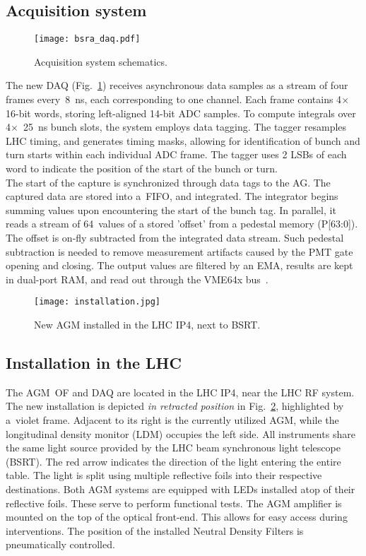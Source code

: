 \subsection{Acquisition system}
\begin{figure}[!tbh]
    \centering
    \texttt{[image: bsra\_daq.pdf]}
    \caption{Acquisition system schematics.}
    \label{fig:bsra_daq}
\end{figure}
%
The new DAQ (Fig.~\ref{fig:bsra_daq}) receives asynchronous data samples as a stream of four frames every~\SI{8}{\nano s}, each corresponding to one channel.
%
Each frame contains 4$\times$16-bit words, storing left-aligned 14-bit ADC samples. 
%
To compute integrals over 4$\times$~\SI{25}{\nano\second} bunch slots, the system employs data tagging. 
%
The tagger resamples LHC timing, and generates timing masks, allowing for identification of bunch and turn starts within each individual ADC frame.
%
The tagger uses 2 LSBs of each word to indicate the position of the start of the bunch or turn.
\\
The start of the capture is synchronized through data tags to the AG.
%
The captured data are stored into a~FIFO, and integrated. 
%
The integrator begins summing values upon encountering the start of the bunch tag.
%
In parallel, it reads a stream of 64~values of a stored 'offset' from a pedestal memory (P[63:0]).
%
The offset is on-fly subtracted from the integrated data stream. 
%
Such pedestal subtraction is needed to remove measurement artifacts caused by the PMT gate opening and closing. 
%
The output values are filtered by an EMA, results are kept in dual-port RAM, and read out through the VME64x bus~\cite{my_thesis}.

\begin{figure}[!tbh]
    \centering
    \texttt{[image: installation.jpg]}
    \caption{New AGM installed in the LHC IP4, next to BSRT.}
    \label{fig:installation}
\end{figure}

\subsection{Installation in the LHC}

The AGM~OF and DAQ are located in the LHC IP4, near the LHC RF system. The
new installation is depicted \textit{in retracted position} in Fig.~\ref{fig:installation}, highlighted by a~violet frame. Adjacent to its right is the currently utilized AGM, while
the longitudinal density monitor (LDM) occupies the left side. All instruments share the same light source
provided by the LHC beam synchronous light telescope (BSRT). The red
arrow indicates the direction of the light entering the entire table.
The light is split using multiple reflective foils into their respective destinations. Both AGM systems are equipped with LEDs installed atop of their reflective foils. These serve to perform functional tests.
The
AGM amplifier is mounted on the top of the optical front-end. This allows for easy access during interventions. The position of the installed Neutral Density Filters is pneumatically controlled.

